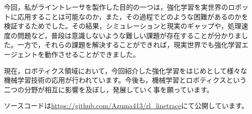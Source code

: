 今回，私がライントレーサを製作した目的の一つは，強化学習を実世界のロボットに応用することは可能なのか，また，その過程でどのような困難があるのかを検証するためでした。その結果，シミュレーションと現実のギャップや，処理速度の問題など，普段は意識しないような難しい課題が存在することが分かりました。一方で，それらの課題を解決することができれば，現実世界でも強化学習エージェントを動作させることができました。

現在，ロボティクス領域において，今回紹介した強化学習をはじめとして様々な機械学習技術の応用が行われています。今後も，機械学習とロボティクスという二つの分野が相互に影響を及ぼし，発展していく事を願っています。

ソースコードは\url{https://github.com/Azuma413/rl_linetrace}にて公開しています。
